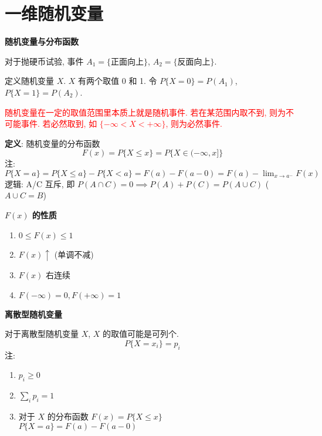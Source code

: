 \documentclass[padp]{ExBook}
\begin{document}
\section{一维随机变量}
\textbf{随机变量与分布函数}
\vspace{1em}

对于抛硬币试验,
事件 $A_1 = \{$正面向上$\}$, $A_2 = \{$反面向上$\}$.

定义随机变量 $X$. $X$ 有两个取值 0 和 1.
令 $P\{X=0\} = P(A_1)$, $P\{X=1\} = P(A_2)$.

\textcolor{red}{随机变量在一定的取值范围里本质上就是随机事件.}
\textcolor{red}{若在某范围内取不到, 则为不可能事件.}
\textcolor{red}{若必然取到, 如 $\{-\infty < X < +\infty\}$, 则为必然事件.}

\vspace{1em}

\textbf{定义}: 随机变量的分布函数
$$ F(x) = P\{X \le x\} = P\{X \in (-\infty, x]\} $$
注: $P\{X=a\} = P\{X \le a\} - P\{X < a\} = F(a) - F(a-0) = F(a) - \lim_{x\to a^-}F(x)$ \\
逻辑: A/C 互斥, 即 $P(A \cap C) = 0 \implies P(A)+P(C)=P(A \cup C)$ \quad ($A \cup C = B$)

\vspace{1em}
\textbf{$F(x)$ 的性质}
\begin{enumerate}[label=\arabic*.]
    \item $0 \le F(x) \le 1$
    \item $F(x) \uparrow$ (单调不减)
    \item $F(x)$ 右连续
    \item $F(-\infty)=0, F(+\infty)=1$
\end{enumerate}

\hrulefill
\vspace{1em}

\textbf{离散型随机变量}
\vspace{1em}

对于离散型随机变量 $X$, $X$ 的取值可能是可列个.
$$ P\{X=x_i\} = p_i $$
注:
\begin{enumerate}[label=\arabic*.]
    \item $p_i \ge 0$
    \item $\sum_i p_i = 1$
    \item 对于 $X$ 的分布函数 $F(x) = P\{X \le x\}$ \\
    $P\{X=a\} = F(a) - F(a-0)$
\end{enumerate}

\hrulefill
\vspace{1em}
\end{document}
